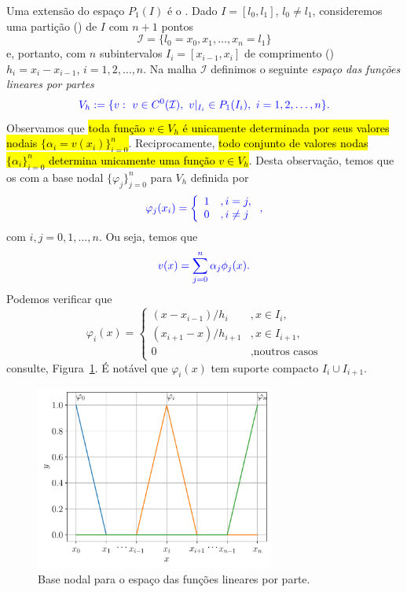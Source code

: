 Uma extensão do espaço $P_1(I)$ é o . Dado $I = [l_0, l_1]$, $l_0\neq l_1$, consideremos uma partição () de $I$ com $n+1$ pontos
\begin{equation}
  \mathcal{I} = \{l_0=x_0, x_1, \dotsc, x_n=l_1\}
\end{equation}
e, portanto, com $n$ subintervalos $I_i=[x_{i-1}, x_{i}]$ de comprimento () $h_i = x_i-x_{i-1}$, $i=1, 2, \dotsc, n$. Na malha $\mathcal{I}$ definimos o seguinte \emph{espaço das funções lineares por partes}
\begin{equation}\color{blue}V_h := \{v:~v\in C^0(\mathcal{I}),~v|_{I_i}\in P_1(I_i),~i=1,2,\dotsc,n\}.
\end{equation}
Observamos que \hl{toda função $v\in V_h$ é unicamente determinada por seus valores nodais $\{\alpha_i = v(x_i)\}_{i=0}^n$}. Reciprocamente, \hl{todo conjunto de valores nodas $\{\alpha_i\}_{i=0}^n$ determina unicamente uma função $v\in V_h$}. Desta observação, temos que os  com a base nodal $\{\varphi_j\}_{j=0}^n$ para $V_h$ definida por
\begin{equation}\color{blue}\varphi_j(x_i) = \left\{
    \begin{array}{ll}
      1 &, i=j,\\
      0 &, i\neq j
    \end{array}
\right.,
\end{equation}
com $i,j=0,1,\dotsc,n$. Ou seja, temos que
\begin{equation}\color{blue}v(x) = \sum_{j=0}^{n}\alpha_j\phi_j(x).
\end{equation}
Podemos verificar que
\begin{equation}
  \varphi_i(x) = \left\{
    \begin{array}{ll}
      (x-x_{i-1})/h_i &, x\in I_i,\\
      (x_{i+1}-x)/h_{i+1} &, x\in I_{i+1},\\
      0 &, \text{noutros casos}
    \end{array}
\right.
\end{equation}
consulte, Figura~\ref{fig:baselinear}. É notável que $\varphi_i(x)$ tem suporte compacto $I_i\cup I_{i+1}$.

\begin{figure}[h!]
  \centering
  \includegraphics[width=0.7\textwidth]{./cap_mef1d/dados/fig_baselinear/fig}
  \caption{Base nodal para o espaço das funções lineares por parte.}
  \label{fig:baselinear}
\end{figure}


